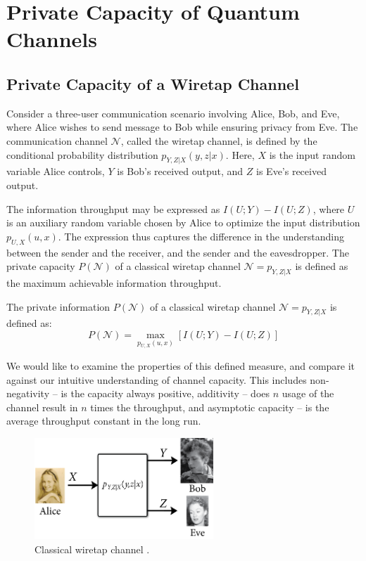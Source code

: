 \section{Private Capacity of Quantum Channels}

\subsection{Private Capacity of a Wiretap Channel}

Consider a three-user communication scenario involving Alice, Bob, and Eve, where Alice wishes to send message to Bob while ensuring privacy from Eve. The communication channel $\mathcal{N}$, called the wiretap channel, is defined by the conditional probability distribution $p_{Y,Z|X}(y, z|x)$. Here, $X$ is the input random variable Alice controls, $Y$ is Bob's received output, and $Z$ is Eve's received output.

The information throughput may be expressed as $I(U; Y) - I(U; Z)$, where $U$ is an auxiliary random variable chosen by Alice to optimize the input distribution $p_{U,X}(u, x)$. The expression thus captures the difference in the understanding between the sender and the receiver, and the sender and the eavesdropper. The private capacity $P(\mathcal{N})$ of a classical wiretap channel $\mathcal{N} = p_{Y,Z|X}$ is defined as the maximum achievable information throughput.

\begin{definition}
The private information $P(\mathcal{N})$ of a classical wiretap channel $\mathcal{N} = p_{Y,Z|X}$ is defined as:
$$P(\mathcal{N}) = \max_{p_{U,X}(u,x)} \left[ I(U;Y) - I(U;Z) \right]$$
\end{definition}

We would like to examine the properties of this defined measure, and compare it against our intuitive understanding of channel capacity. This includes non-negativity -- is the capacity always positive, additivity -- does $n$ usage of the channel result in $n$ times the throughput, and asymptotic capacity -- is the average throughput constant in the long run.

\begin{figure}[H]
    \centering
    \includegraphics[width=0.6\textwidth]{figures/private_communication_wiretap_channel.png}
    \caption{Classical wiretap channel \cite{Wilde_2016}.}
\end{figure}

